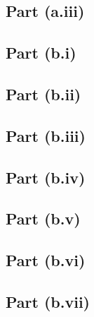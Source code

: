 \subsection{Part (a.iii)}\label{sec:q-1-a-iii}
\subsection{Part (b.i)}\label{sec:q-1-b-i}
\subsection{Part (b.ii)}\label{sec:q-1-b-ii}
\subsection{Part (b.iii)}\label{sec:q-1-b-iii}
\subsection{Part (b.iv)}\label{sec:q-1-b-iv}
\subsection{Part (b.v)}\label{sec:q-1-b-v}
\subsection{Part (b.vi)}\label{sec:q-1-b-vi}
\subsection{Part (b.vii)}\label{sec:q-1-b-vii}
